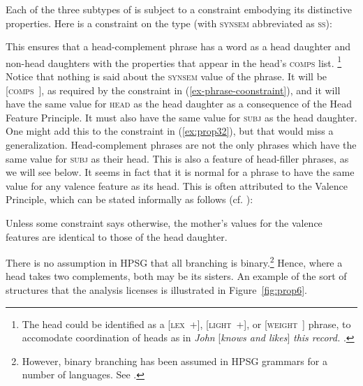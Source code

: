 \documentclass[output=paper
	        ,collection
	        ,collectionchapter
 	        ,biblatex
                ,babelshorthands
                ,newtxmath
                ,draftmode
                ,colorlinks, citecolor=brown
]{langscibook}
\begin{document}
\ea\label{ex:prop31}\label{page-hfp}
 \impl
{}
\z

\noindent
Each of the three subtypes of  is subject to a constraint embodying its distinctive properties. Here is a constraint on the type  (with \textsc{synsem} abbreviated as \textsc{ss}):

\ea\label{ex:prop32}
 \impl
{}
\z

\noindent
This ensures that a head-complement phrase has a word as a head daughter and non-head daughters with the  properties that appear in the head’s \textsc{comps} list.%
%
\footnote{The head could be identified as a [\textsc{lex}~+], [\textsc{light}~+], or [\textsc{weight}~] phrase, to accomodate coordination of heads as in \emph{John} [\emph{knows and likes}] \emph{this record.} \citep[Section~5.1]{Abeille2006a}.}
%
Notice that nothing is said about the \textsc{synsem} value of the phrase. It will be [\textsc{comps}~\eliste], as required by the constraint in (\ref{ex-phrase-coonstraint}), and it will have the same value for \textsc{head} as the head daughter as a consequence of the Head Feature Principle. It must also have the same value for \textsc{subj} as the head daughter. One might add this to the constraint in (\ref{ex:prop32}), but that would miss a generalization. Head-complement phrases are not the only phrases which have the same value for \textsc{subj} as their head. This is also a feature of head-filler phrases, as we will see below. It seems in fact that it is normal for a phrase to have the same value for any valence feature as its head. This is often attributed to the Valence Principle, which can be stated informally as follows (cf. \citealp[]{SagW99a-u}):

\ea\label{ex:prop33}
\label{prop:valence-principle}
Unless some constraint says otherwise, the mother's values for the valence features are identical to those of the head daughter.
\z

There is no assumption in HPSG that all branching is binary.\footnote{%
However, binary branching has been assumed in HPSG grammars for a number of languages. See .}
%
Hence, where a head takes two complements, both may be its sisters. An example of the sort of structures that the analysis licenses is illustrated in Figure~\ref{fig:prop6}.
\end{document}
